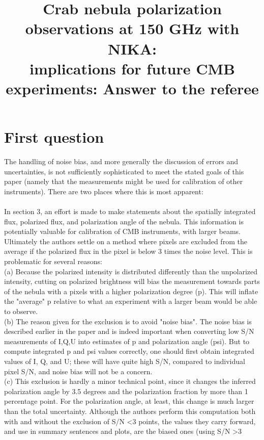 \documentclass[report,onecolumn]{aa}
\begin{document}
\title{Crab nebula polarization observations at 150 GHz with NIKA: \\ implications for future CMB experiments: Answer to the referee}

\section{First question}

The handling of noise bias, and more generally the discussion of
errors and uncertainties, is not sufficiently sophisticated to meet the
stated goals of this paper (namely that the measurements might be used
for calibration of other instruments). There are two places where
this is most apparent:
\\ \\
In section 3, an effort is made to make statements about the spatially
integrated flux, polarized flux, and polarization angle of the nebula.
This information is potentially valuable for calibration of CMB
instruments, with larger beams. Ultimately the authors settle on a
method where pixels are excluded from the average if the polarized
flux in the pixel is below 3 times the noise level. This is
problematic for several reasons:\\
(a) Because the polarized intensity is distributed differently than
the unpolarized intensity, cutting on polarized brightness will bias
the measurement towards parts of the nebula with a pixels with a
higher polarization degree (p). This will inflate the "average" p
relative to what an experiment with a larger beam would be able to
observe.\\
(b) The reason given for the exclusion is to avoid "noise bias". The
noise bias is described earlier in the paper and is indeed important
when converting low S/N measurements of I,Q,U into estimates of p and
polarization angle (psi). But to compute integrated p and psi values
correctly, one should first obtain integrated values of I, Q, and U;
these will have quite high S/N, compared to individual pixel S/N, and
noise bias will not be a concern.\\
(c) This exclusion is hardly a minor technical point, since it changes
the inferred polarization angle by 3.5 degrees and the polarization
fraction by more than 1 percentage point. For the polarization angle,
at least, this change is much larger than the total uncertainty.
Although the authors perform this computation both with and without
the exclusion of S/N \textless 3 points, the values they carry forward, and
use in summary sentences and plots, are the biased ones (using S/N \textgreater 3
\end{document}
